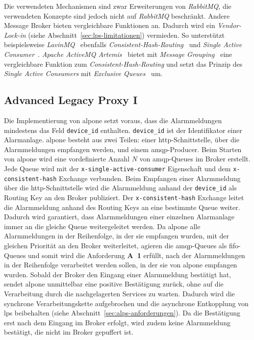 \newpage

Die verwendeten Mechanismen sind zwar Erweiterungen von \textit{RabbitMQ}, die verwendeten Konzepte sind jedoch nicht auf \textit{RabbitMQ} beschränkt. Andere Message Broker bieten vergleichbare Funktionen an. Dadurch wird ein \textit{Vendor-Lock-in} (siehe Abschnitt~\ref{sec:lps-limitationen}) vermieden. So unterstützt beispielsweise \textit{LavinMQ}~\citep{lavinmq_broker} ebenfalls \textit{Consistent-Hash-Routing}~\citep{lavinmq_consistent_hash} und \textit{Single Active Consumer}~\citep{lavinmq_single_active_consumer}. \textit{Apache ActiveMQ Artemis}~\citep{artemis_broker} bietet mit \textit{Message Grouping}~\citep{artemis_message_grouping} eine vergleichbare Funktion zum \textit{Consistent-Hash-Routing} und setzt das Prinzip des \textit{Single Active Consumers} mit \textit{Exclusive Queues}~\citep{artemis_exclusive_queues} um.

\subsection{Advanced Legacy Proxy I}
\label{sub-sec:alpone}

Die Implementierung von \gls{alpone} setzt voraus, dass die Alarmmeldungen mindestens das Feld \texttt{device\_id} enthalten. \texttt{device\_id} ist der Identifikator einer Alarmanlage. \gls{alpone} besteht aus zwei Teilen: einer \gls{http}-Schnitt\-stel\-le, über die Alarmmeldungen empfangen werden, und einem \gls{amqp}-Pro\-du\-cer. Beim Starten von \gls{alpone} wird eine vordefinierte Anzahl $N$ von \gls{amqp}-Queues im Broker erstellt. Jede Queue wird mit der \texttt{x-single-active-consumer} Eigenschaft und dem \texttt{x-consistent-hash} Exchange verbunden. Beim Empfangen einer Alarmmeldung über die \gls{http}-Schnittstelle wird die Alarmmeldung anhand der \texttt{device\_id} als Routing Key an den Broker publiziert. Der \texttt{x-consistent-hash} Exchange leitet die Alarmmeldung anhand des Routing Keys an eine bestimmte Queue weiter. Dadurch wird garantiert, dass Alarmmeldungen einer einzelnen Alarmanlage immer an die gleiche Queue weitergeleitet werden. Da \gls{alpone} alle Alarmmeldungen in der Reihenfolge, in der sie empfangen wurden, mit der gleichen Priorität an den Broker weiterleitet, agieren die \gls{amqp}-Queues als \gls{fifo}-Queues und somit wird die Anforderung \textbf{A~1} erfüllt, nach der Alarmmeldungen in der Reihenfolge verarbeitet werden sollen, in der sie von \gls{alpone} empfangen wurden. Sobald der Broker den Eingang einer Alarmmeldung bestätigt hat, sendet \gls{alpone} unmittelbar eine positive Bestätigung zurück, ohne auf die Verarbeitung durch die nachgelagerten Services zu warten. Dadurch wird die synchrone Verarbeitungskette aufgebrochen und die asynchrone Entkopplung von \gls{lps} beibehalten (siehe Abschnitt~\ref{sec:alps-anforderungen}). Da die Bestätigung erst nach dem Eingang im Broker erfolgt, wird zudem keine Alarmmeldung bestätigt, die nicht im Broker gepuffert ist.

